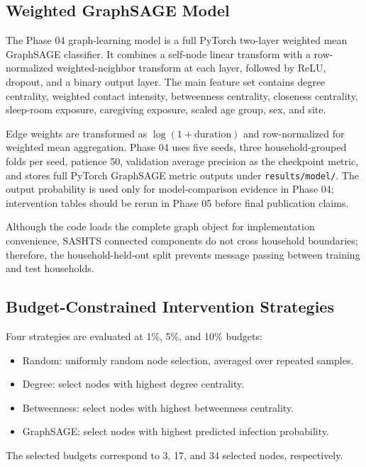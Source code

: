\documentclass[11pt,a4paper]{article}
\begin{document}
\subsection{Weighted GraphSAGE Model}

The Phase 04 graph-learning model is a full PyTorch two-layer weighted mean GraphSAGE classifier. It combines a self-node linear transform with a row-normalized weighted-neighbor transform at each layer, followed by ReLU, dropout, and a binary output layer. The main feature set contains degree centrality, weighted contact intensity, betweenness centrality, closeness centrality, sleep-room exposure, caregiving exposure, scaled age group, sex, and site.

Edge weights are transformed as \(\log(1 + \mathrm{duration})\) and row-normalized for weighted mean aggregation. Phase 04 uses five seeds, three household-grouped folds per seed, patience 50, validation average precision as the checkpoint metric, and stores full PyTorch GraphSAGE metric outputs under \texttt{results/model/}. The output probability is used only for model-comparison evidence in Phase 04; intervention tables should be rerun in Phase 05 before final publication claims.

Although the code loads the complete graph object for implementation convenience, SASHTS connected components do not cross household boundaries; therefore, the household-held-out split prevents message passing between training and test households.

\subsection{Budget-Constrained Intervention Strategies}

Four strategies are evaluated at 1\%, 5\%, and 10\% budgets:

\begin{itemize}
  \item Random: uniformly random node selection, averaged over repeated samples.
  \item Degree: select nodes with highest degree centrality.
  \item Betweenness: select nodes with highest betweenness centrality.
  \item GraphSAGE: select nodes with highest predicted infection probability.
\end{itemize}

The selected budgets correspond to 3, 17, and 34 selected nodes, respectively.
\end{document}
